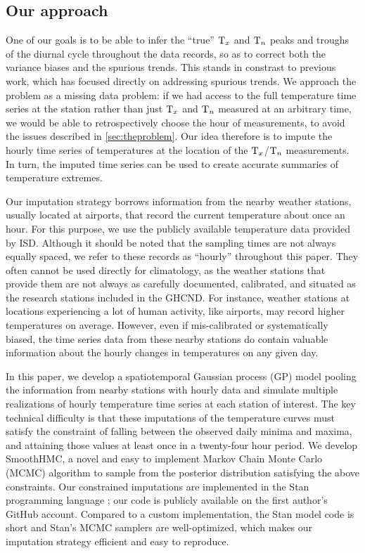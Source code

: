 \subsection{Our approach}\label{sec:approach}
    
One of our goals is to be able to infer the ``true'' \(\mathrm{T}_{x}\) and \(\mathrm{T}_{n}\) peaks and troughs of the diurnal cycle throughout the data records, so as to correct both the variance biases and the spurious trends.
This stands in constrast to previous work, which has focused directly on addressing spurious trends.
We approach the problem as a missing data problem: 
if we had access to the full temperature time series at the station rather than just \(\mathrm{T}_{x}\) and \(\mathrm{T}_{n}\) measured at an arbitrary time, 
we would be able to retrospectively choose the hour of measurements, to avoid the issues described in \autoref{sec:theproblem}.
Our idea therefore is to impute the hourly time series of temperatures
at the location of the \(\mathrm{T}_{x}\)/\(\mathrm{T}_{n}\) measurements.
In turn, the imputed time series can be used to create accurate summaries of temperature extremes.

Our imputation strategy borrows information from the nearby weather stations, usually located at airports, that record the current temperature about once an hour.
For this purpose, we use the publicly available temperature data provided by ISD.
Although it should be noted that the sampling times are not always equally spaced, we refer to these records as ``hourly'' throughout this paper.
They often cannot be used directly for climatology, as the weather stations that provide them are not always as carefully documented, calibrated, and situated as the research stations included in the GHCND. 
For instance, weather stations at locations experiencing a lot of human activity, like airports, may record higher temperatures on average.
However, even if mis-calibrated or systematically biased, the time series data from these nearby stations do contain valuable information about the hourly changes in temperatures on any given day.

In this paper, we develop a spatiotemporal Gaussian process (GP) model pooling the information from nearby stations with hourly data and simulate multiple realizations of hourly temperature time series at each station of interest.
The key technical difficulty is that these imputations of the temperature curves must satisfy the constraint of falling between the observed daily minima and maxima, and attaining those values at least once in a twenty-four hour period.
We develop SmoothHMC, a novel and easy to implement Markov Chain Monte Carlo (MCMC) algorithm to sample from the posterior distribution satisfying the above constraints.
Our constrained imputations are implemented in the Stan programming language \citep{stancite}; our code is publicly available on the first author's GitHub account.
Compared to a custom implementation, the Stan model code is short and Stan's MCMC samplers are well-optimized, which makes our imputation strategy efficient and easy to reproduce.


